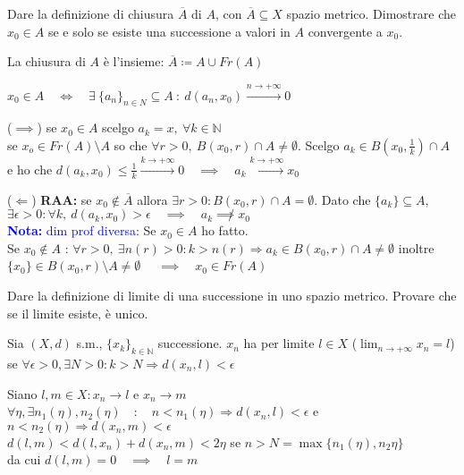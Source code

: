 \documentclass{exam}
\newcommand{\N}[0]{\mathbb{N}}
\newcommand{\nota}[1]{\textcolor{blue}{\textbf{Nota: }#1}}
\begin{document}
\begin{questions}
\question Dare la definizione di chiusura $\overline{A}$ di $A$, con $\overline{A} \subseteq X$ spazio metrico. Dimostrare che $x_0 \in A$ se e solo se esiste una successione a valori in $A$ convergente a $x_0$.
\begin{solution}
    La chiusura di $A$ è l'insieme: $\overline{A} \coloneqq A \cup Fr(A)$

    $x_0 \in A \quad\iff\quad \exists\  \{a_n\}_{n \in N} \subseteq A \ : \ d(a_n,x_0) \xrightarrow{n \rightarrow +\infty} 0$
    
    ($\implies$) se $x_0 \in A$ scelgo $a_k = x ,\ \forall k\in\N$\\
    se $x_o \in Fr(A)\setminus A$ so che $\forall r>0,\  B(x_0,r)\cap A \not= \emptyset$. Scelgo $a_k \in B(x_0, \frac{1}{k})\cap A$ e ho che $d(a_k,x_0)\leq \frac{1}{k} \xrightarrow{k\rightarrow + \infty} 0 \quad\implies\quad a_k \xrightarrow{k\rightarrow + \infty}x_0$
    
    
    ($\Longleftarrow$) \textbf{RAA:} se $x_0 \not\in \overline{A}$ allora $\exists r>0 : B(x_0, r) \cap A = \emptyset$. Dato che $\{a_k\} \subseteq A$, $\exists \epsilon > 0 : \forall k, \  d(a_k,x_0) >\epsilon \quad \implies \quad a_k\not \implies x_0$\\
    \nota{dim prof diversa:}
    Se $x_0 \in A$ ho fatto.\\
    Se $x_0\not\in A$ : $\forall r>0,\ \exists n(r) >0 : k> n(r) \Rightarrow a_k \in B(x_0,r)\cap A \not= \emptyset $ inoltre $\{x_0\} \in B(x_0, r)\setminus A \not= \emptyset$ $\quad\implies\quad x_0 \in Fr(A)$
\end{solution}

\question Dare la definizione di limite di una successione in uno spazio metrico. Provare che se il limite esiste, è unico.
\begin{solution}
    Sia $(X, d)$ s.m., $\{x_k\}_{k\in \N}$ successione. $x_n$ ha per limite $l\in X$ ($\lim_{n\rightarrow + \infty} x_n = l$) se $\forall \epsilon>0, \exists N>0 : k>N \Rightarrow d(x_n, l) < \epsilon$

    Siano $l,m \in X : x_n \rightarrow l$ e $x_n \rightarrow m$\\
    $\forall \eta, \exists n_1(\eta),n_2(\eta) \quad:\quad n< n_1(\eta) \Rightarrow  d(x_n,l) < \epsilon $ e $ n< n_2(\eta) \Rightarrow d(x_n,m)< \epsilon$\\
    $d(l,m) < d(l, x_n) + d(x_n, m) < 2\eta$ se $ n> N = \max\{n_1(\eta),n_2{\eta}\}$\\
    da cui $d(l,m) = 0  \quad\implies \quad l=m$
\end{solution}


\end{questions}
\end{document}
